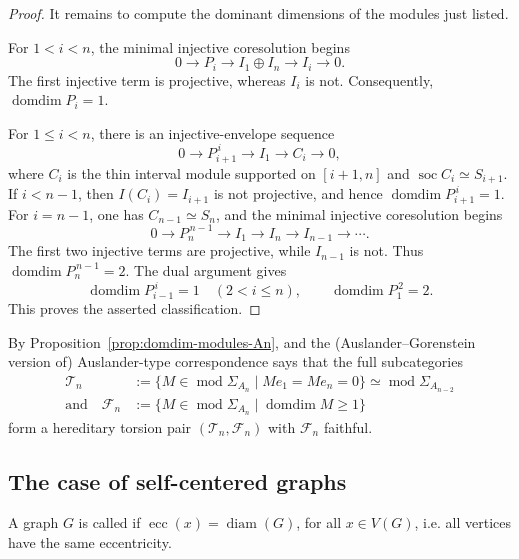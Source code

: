 \documentclass[a4paper,leqno]{amsart}
\begin{document}
\begin{proof}
It remains to compute the dominant dimensions of the modules just
listed. 

For $1<i<n$, the minimal injective coresolution begins
\[
0\longrightarrow P_i
 \longrightarrow I_1\oplus I_n
 \longrightarrow I_i
 \longrightarrow0.
\]
The first injective term is projective, whereas $I_i$ is not.
Consequently, $\operatorname{domdim}P_i=1$.

For $1\leq i<n$, there is an injective-envelope sequence
\[
0\longrightarrow P_{i+1}^{\,i}
 \longrightarrow I_1
 \longrightarrow C_i
 \longrightarrow0,
\]
where $C_i$ is the thin interval module supported on $[i+1,n]$ and
$\operatorname{soc}C_i\simeq S_{i+1}$. If $i<n-1$, then $I(C_i)=I_{i+1}$ is not projective, and hence $\operatorname{domdim}P_{i+1}^{\,i}=1$. For $i=n-1$, one has $C_{n-1}\simeq S_n$, and the minimal injective coresolution begins
\[
0\longrightarrow P_n^{\,n-1}
 \longrightarrow I_1
 \longrightarrow I_n
 \longrightarrow I_{n-1}
 \longrightarrow\cdots.
\]
The first two injective terms are projective, while $I_{n-1}$ is not. Thus $\operatorname{domdim}P_n^{\,n-1}=2$.
The dual argument gives
\[
\operatorname{domdim}P_{i-1}^{\,i}=1
\quad(2<i\leq n),
\qquad
\operatorname{domdim}P_1^{\,2}=2.
\]
This proves the asserted classification.
\end{proof}


\begin{rmk}\label{rmk:torsionfree-class-An}
By Proposition~\ref{prop:domdim-modules-An}, and the (Auslander--Gorenstein version of) Auslander-type correspondence \cite[Theorem 4.4.1]{Iya07} says that the full subcategories
\begin{align*}
\mathcal T_n
&:=\{M\in\operatorname{mod}\Sigma_{A_n}
  \mid Me_1=Me_n=0\}\simeq \operatorname{mod} \Sigma_{A_{n-2}}\\
\text{and}\quad  
\mathcal F_n &:=\{M\in\operatorname{mod}\Sigma_{A_n}
  \mid \operatorname{domdim}M\geq1\}
\end{align*}
form a hereditary torsion pair $(\mathcal T_n,\mathcal F_n)$ with $\mathcal F_n$ faithful. 
\end{rmk}

\subsection{The case of self-centered graphs}\label{sec:self-centered}

\begin{dfn}\label{def:self-centered}\cite{Buc89,BH90}
A graph $G$ is called  if $\operatorname{ecc}(x)=\operatorname{diam}(G)$, for all $x\in V(G)$, i.e. all vertices have the same eccentricity.
\end{dfn}
\end{document}

